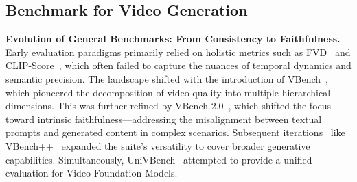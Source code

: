 \documentclass{article}
\begin{document}




\subsection{Benchmark for Video Generation}

\noindent
\textbf{Evolution of General Benchmarks: From Consistency to Faithfulness.} Early evaluation paradigms primarily relied on holistic metrics such as FVD~\cite{fvd} and CLIP-Score~\cite{clip}, which often failed to capture the nuances of temporal dynamics and semantic precision. The landscape shifted with the introduction of VBench~\cite{vbench}, which pioneered the decomposition of video quality into multiple hierarchical dimensions. This was further refined by VBench 2.0~\cite{vbench2}, which shifted the focus toward intrinsic faithfulness—addressing the misalignment between textual prompts and generated content in complex scenarios. Subsequent iterations~\cite{msvbench,muss,avgenbench} like VBench++~\cite{vbench++} expanded the suite's versatility to cover broader generative capabilities. Simultaneously, UniVBench~\cite{univbench} attempted to provide a unified evaluation for Video Foundation Models.
\end{document}
